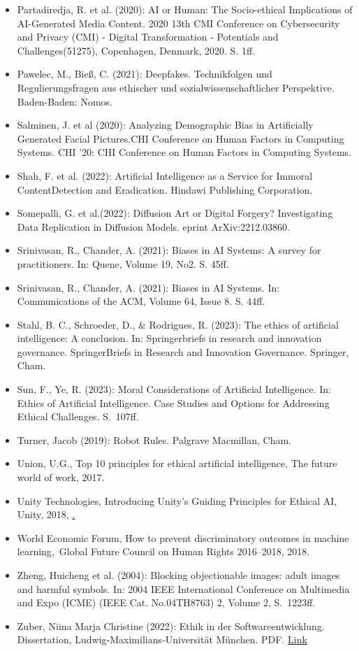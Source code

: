 \documentclass[12pt]{article}
\begin{document}
\begin{itemize}
\item Partadiredja, R. et al. (2020): AI or Human: The Socio-ethical Implications of AI-Generated Media Content. 2020 13th CMI Conference on Cybersecurity and Privacy (CMI) - Digital Transformation - Potentials and Challenges(51275), Copenhagen, Denmark, 2020. S. 1ff.
\item Pawelec, M., Bieß, C. (2021):  Deepfakes. Technikfolgen und Regulierungsfragen aus ethischer und sozialwissenschaftlicher Perspektive. Baden-Baden: Nomos.
\item Salminen, J. et al (2020): Analyzing Demographic Bias in Artificially Generated Facial Pictures.CHI Conference on Human Factors in Computing Systems. CHI '20: CHI Conference on Human Factors in Computing Systems.
\item Shah, F. et al. (2022): Artificial Intelligence as a Service for Immoral ContentDetection and Eradication. Hindawi Publishing Corporation.
\item Somepalli, G. et al.(2022): Diffusion Art or Digital Forgery? Investigating Data Replication in Diffusion Models. eprint ArXiv:2212.03860.
\item Srinivasan, R., Chander, A. (2021): Biases in AI Systems: A survey for practitioners. In: Quene, Volume 19, No2. S. 45ff.
\item Srinivasan, R., Chander, A. (2021): Biases in AI Systems. In: Communications of the ACM, Volume 64, Issue 8. S. 44ff.
\item Stahl, B. C., Schroeder, D., \& Rodrigues, R. (2023): The ethics of artificial intelligence: A conclusion. In: Springerbriefs in research and innovation governance. SpringerBriefs in Research and Innovation Governance. Springer, Cham.
\item Sun, F., Ye, R. (2023): Moral Considerations of Artificial Intelligence. In: Ethics of Artificial Intelligence. Case Studies and Options for Addressing Ethical Challenges. S. 107ff.
\item Turner, Jacob (2019): Robot Rules. Palgrave Macmillan, Cham.
\item Union, U.G., Top 10 principles for ethical artificial intelligence, The future world of work,  2017.
\item Unity Technologies, Introducing Unity’s Guiding Principles for Ethical AI, Unity, 2018, \href{https://blog.unity.com/technology/introducing-unitys-guiding-principles-for-ethical-ai}.
\item World Economic Forum, How to prevent discriminatory outcomes in machine learning, Global Future Council on Human Rights 2016–2018, 2018.
\item Zheng, Huicheng et al. (2004): Blocking objectionable images: adult images and harmful symbols. In: 2004 IEEE International Conference on Multimedia and Expo (ICME) (IEEE Cat. No.04TH8763) 2, Volume 2, S. 1223ff.
\item Zuber, Niina Marja Christine (2022): Ethik in der Softwareentwicklung. Dissertation, Ludwig‐Maximilians‐Universität München. PDF. \href{https://edoc.ub.uni-muenchen.de/31152/1/Zuber_Niina_Marja_Christine.pdf}{Link}
\end{itemize}
\end{document}
